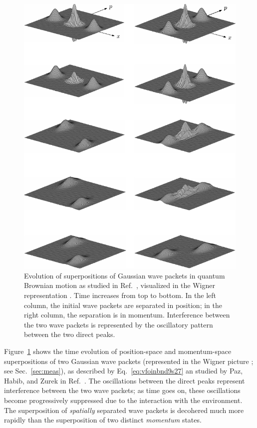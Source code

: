 \documentclass[3p,sort&compress,12pt]{elsarticle}
\begin{document}
\begin{figure}
\centering
\includegraphics[scale=1]{psdec.pdf}
\caption{Evolution of superpositions of Gaussian wave packets in quantum Brownian motion as studied in Ref.~\cite{Paz:1993:ta}, visualized in the Wigner representation \cite{Wigner:1932:un,Hillery:1984:tv}. Time increases from top to bottom. In the left column, the initial wave packets are separated in position; in the right column, the separation is in momentum. Interference between the two wave packets is represented by the oscillatory pattern between the two direct peaks.}
\label{fig:gaussmov}
\end{figure}

Figure~\ref{fig:gaussmov} shows the time evolution of position-space and momentum-space superpositions of two Gaussian wave
packets (represented in the Wigner picture \cite{Wigner:1932:un,Hillery:1984:tv}; see Sec.~\ref{sec:meas}), as described by Eq.~\eqref{eq:vfoinbnd9s27} an studied by Paz, Habib, and Zurek in Ref.~\cite{Paz:1993:ta}. The oscillations between the direct peaks represent interference between the two wave packets; as time goes on, these oscillations become progressively suppressed due to the interaction with the environment. The superposition of \emph{spatially} separated wave packets is decohered much more rapidly than the superposition of two distinct \emph{momentum} states. 
\end{document}
